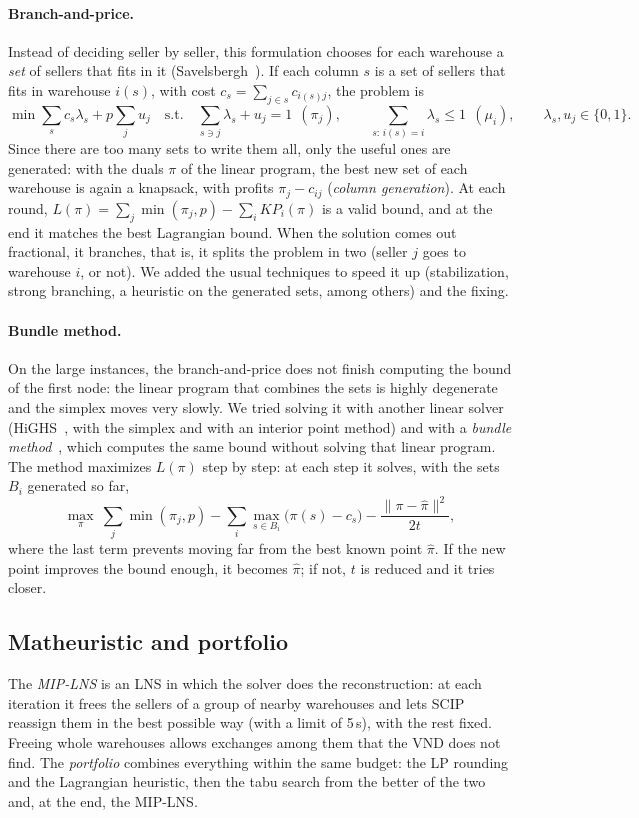 \documentclass[11pt,a4paper]{article}
\begin{document}
\paragraph{Branch-and-price.} Instead of deciding seller by seller, this formulation chooses for
each warehouse a \emph{set} of sellers that fits in it (Savelsbergh~\cite{savelsbergh1997}). If each
column $s$ is a set of sellers that fits in warehouse $i(s)$, with cost $c_s=\sum_{j\in s}c_{i(s)j}$,
the problem is
\[
  \min \sum_s c_s\lambda_s + p\sum_j u_j
  \quad\text{s.t.}\quad
  \sum_{s\ni j}\lambda_s + u_j = 1\ \ (\pi_j),\qquad
  \sum_{s:\,i(s)=i}\lambda_s \le 1\ \ (\mu_i),\qquad
  \lambda_s,u_j\in\{0,1\}.
\]
Since there are too many sets to write them all, only the useful ones are generated: with the
duals $\pi$ of the linear program, the best new set of each warehouse is again a knapsack, with
profits $\pi_j-c_{ij}$ (\emph{column generation}). At each round,
$L(\pi)=\sum_j\min(\pi_j,p)-\sum_i KP_i(\pi)$ is a valid bound, and at the end it matches the best
Lagrangian bound. When the solution comes out fractional, it branches, that is, it splits the
problem in two (seller $j$ goes to warehouse $i$, or not). We added the usual techniques to speed
it up (stabilization, strong branching, a heuristic on the generated sets, among others) and the
fixing.

\paragraph{Bundle method.} On the large instances, the branch-and-price does not finish computing
the bound of the first node: the linear program that combines the sets is highly degenerate and the
simplex moves very slowly. We tried solving it with another linear solver (HiGHS~\cite{highs}, with
the simplex and with an interior point method) and with a \emph{bundle method}~\cite{briant2008},
which computes the same bound without solving that linear program. The method maximizes $L(\pi)$
step by step: at each step it solves, with the sets $B_i$ generated so far,
\[
  \max_\pi\ \sum_j\min(\pi_j,p) - \sum_i\max_{s\in B_i}\bigl(\pi(s)-c_s\bigr) - \frac{\|\pi-\hat\pi\|^2}{2t},
\]
where the last term prevents moving far from the best known point $\hat\pi$. If the new point
improves the bound enough, it becomes $\hat\pi$; if not, $t$ is reduced and it tries closer.

\subsection{Matheuristic and portfolio}
The \emph{MIP-LNS} is an LNS in which the solver does the reconstruction: at each iteration it frees
the sellers of a group of nearby warehouses and lets SCIP reassign them in the best possible way
(with a limit of 5\,s), with the rest fixed. Freeing whole warehouses allows exchanges among them
that the VND does not find. The \emph{portfolio} combines everything within the same budget: the LP
rounding and the Lagrangian heuristic, then the tabu search from the better of the two and, at the
end, the MIP-LNS.
\end{document}
